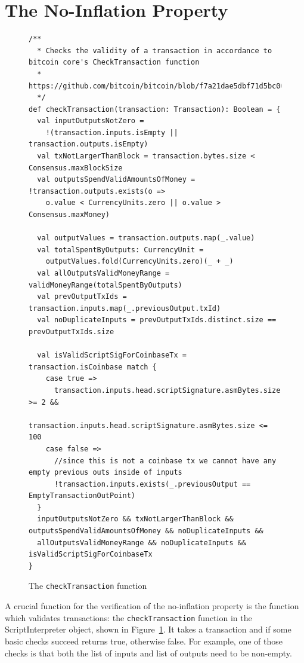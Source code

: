 \documentclass[runningheads]{llncs}
\begin{document}
\section{The No-Inflation Property}

\begin{figure}
\begin{lstlisting}[style=scala]
/**
  * Checks the validity of a transaction in accordance to bitcoin core's CheckTransaction function
  * https://github.com/bitcoin/bitcoin/blob/f7a21dae5dbf71d5bc00485215e84e6f2b309d0a/src/main.cpp#L939.
  */
def checkTransaction(transaction: Transaction): Boolean = {
  val inputOutputsNotZero =
    !(transaction.inputs.isEmpty || transaction.outputs.isEmpty)
  val txNotLargerThanBlock = transaction.bytes.size < Consensus.maxBlockSize
  val outputsSpendValidAmountsOfMoney = !transaction.outputs.exists(o =>
    o.value < CurrencyUnits.zero || o.value > Consensus.maxMoney)

  val outputValues = transaction.outputs.map(_.value)
  val totalSpentByOutputs: CurrencyUnit =
    outputValues.fold(CurrencyUnits.zero)(_ + _)
  val allOutputsValidMoneyRange = validMoneyRange(totalSpentByOutputs)
  val prevOutputTxIds = transaction.inputs.map(_.previousOutput.txId)
  val noDuplicateInputs = prevOutputTxIds.distinct.size == prevOutputTxIds.size

  val isValidScriptSigForCoinbaseTx = transaction.isCoinbase match {
    case true =>
      transaction.inputs.head.scriptSignature.asmBytes.size >= 2 &&
        transaction.inputs.head.scriptSignature.asmBytes.size <= 100
    case false =>
      //since this is not a coinbase tx we cannot have any empty previous outs inside of inputs
      !transaction.inputs.exists(_.previousOutput == EmptyTransactionOutPoint)
  }
  inputOutputsNotZero && txNotLargerThanBlock && outputsSpendValidAmountsOfMoney && noDuplicateInputs &&
  allOutputsValidMoneyRange && noDuplicateInputs && isValidScriptSigForCoinbaseTx
}
\end{lstlisting}
  
  \caption{The \texttt{checkTransaction} function}
  \label{fig:checktrans}
\end{figure}


A crucial function for the verification of the no-inflation property
is the function which validates transactions: the
\texttt{checkTransaction} function in the ScriptInterpreter object,
shown in Figure~\ref{fig:checktrans}. It takes a transaction and if
some basic checks succeed returns true, otherwise false. For example,
one of those checks is that both the list of inputs and list of
outputs need to be non-empty.
\end{document}
